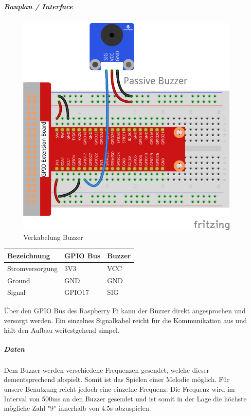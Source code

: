 \documentclass[../../main.tex]{subfiles}
\begin{document}
\subparagraph{Bauplan / Interface}

\begin{figure}[H] \centering
  \includegraphics{VerkabelungAkustik}
  \caption{Verkabelung Buzzer}
  \label{fig:Buzzer}
\end{figure}

\begin{table}[] \centering
\begin{tabular}{lll}
Bezeichnung     & GPIO Bus & Buzzer \\ \hline
Stromversorgung & 3V3      & VCC    \\
Ground          & GND      & GND    \\
Signal          & GPIO17   & SIG
\end{tabular}
\end{table}

Über den GPIO Bus des Raspberry Pi kann der Buzzer direkt angesprochen und versorgt werden. Ein einzelnes Signalkabel reicht für die Kommunikation aus und hält den Aufbau weitestgehend simpel.

\subparagraph{Daten}
Dem Buzzer werden verschiedene Frequenzen gesendet, welche dieser dementsprechend abspielt. Somit ist das Spielen einer Melodie möglich. Für unsere Benutzung reicht jedoch eine einzelne Frequenz. Die Frequenz wird im Interval von 500ms an den Buzzer gesendet und ist somit in der Lage die höchste mögliche Zahl "9" innerhalb von 4.5s abzuspielen.
\end{document}
